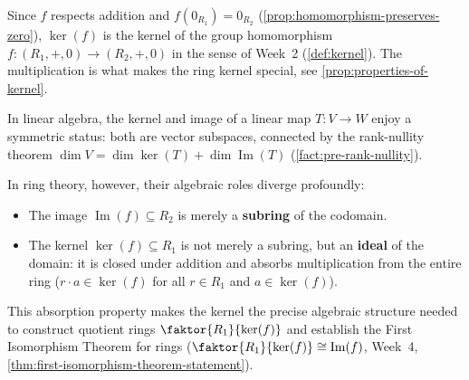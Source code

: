 \begin{content}


\begin{steps}
Since $f$ respects addition and $f(0_{R_1}) = 0_{R_2}$ (\cref{prop:homomorphism-preserves-zero}), $\ker(f)$ is the kernel of the group homomorphism $f \colon (R_1, +, 0) \to (R_2, +, 0)$ in the sense of Week~2 (\cref{def:kernel}). The multiplication is what makes the ring kernel special, see \cref{prop:properties-of-kernel}.
\end{steps}
\end{content}

\begin{insight}
In linear algebra, the kernel and image of a linear map $T \colon V \to W$ enjoy a symmetric status: both are vector subspaces, connected by the rank-nullity theorem $\dim V = \dim \ker(T) + \dim \operatorname{Im}(T)$ (\cref{fact:pre-rank-nullity}).

In ring theory, however, their algebraic roles diverge profoundly:
\begin{itemize}
    \item The image $\operatorname{Im}(f) \subseteq R_2$ is merely a \textbf{subring} of the codomain.
    \item The kernel $\ker(f) \subseteq R_1$ is not merely a subring, but an \textbf{ideal} of the domain: it is closed under addition and absorbs multiplication from the entire ring ($r \cdot a \in \ker(f)$ for all $r \in R_1$ and $a \in \ker(f)$).
\end{itemize}
This absorption property makes the kernel the precise algebraic structure needed to construct quotient rings $\faktor{R_1}{\ker(f)}$ and establish the First Isomorphism Theorem for rings ($\faktor{R_1}{\ker(f)} \cong \operatorname{Im}(f)$, Week~4, \cref{thm:first-isomorphism-theorem-statement}).
\end{insight}

